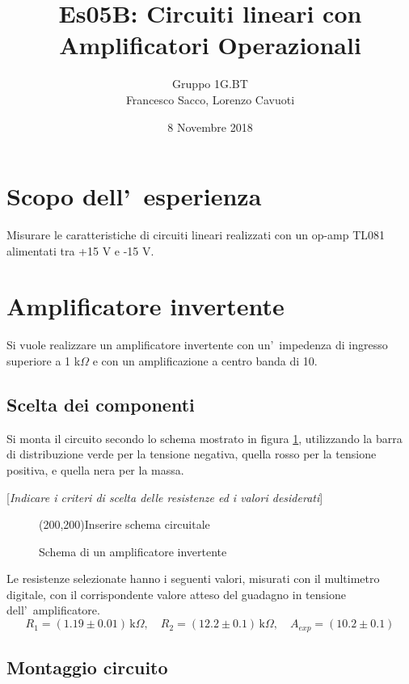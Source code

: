 \documentclass[10pt,a4paper]{article}
\author{Gruppo 1G.BT \\ Francesco Sacco, Lorenzo Cavuoti}
\title{Es05B: Circuiti lineari con Amplificatori Operazionali}
\newcommand{\rem}[1]{[\emph{#1}]}
\begin{document}
\date{8 Novembre 2018}
\maketitle


\section*{Scopo dell'~esperienza}
Misurare le caratteristiche di circuiti lineari realizzati con un op-amp TL081 alimentati tra +15 V e -15 V.

\section{Amplificatore invertente}
Si vuole realizzare un amplificatore invertente con un'~impedenza di ingresso superiore a 1 
k$\Omega$ e con un amplificazione a centro banda di 10.

\subsection{Scelta dei componenti}

Si monta il circuito secondo lo schema mostrato in figura \ref{fig:ampinv}, utilizzando la barra di 
distribuzione verde per la tensione negativa, quella rosso per la tensione positiva, e quella nera per 
la massa.

\rem{Indicare i criteri di scelta delle resistenze ed i valori desiderati}
%
\begin{figure}[h]
\begin{center}
\framebox(200,200){Inserire schema circuitale}
\caption{\small Schema di un amplificatore invertente}
\label{fig:ampinv}
\end{center}
\end{figure}
%

Le resistenze selezionate hanno i seguenti valori, misurati con il multimetro digitale, con il corrispondente valore atteso 
del guadagno in tensione dell'~amplificatore.
\[
R_1 = ( 1.19 \pm 0.01) \,\mathrm{k}\Omega, \quad 
R_2 = ( 12.2 \pm 0.1) \,\mathrm{k}\Omega, \quad 
A_{exp} = ( 10.2 \pm 0.1)
\]

\subsection{Montaggio circuito}

\end{document}
